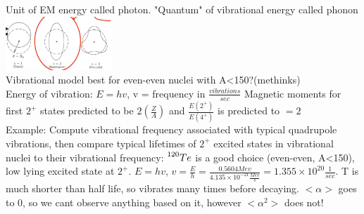 \documentclass{article}
\begin{document}
\begin{multicols}{3}
Unit of EM energy called photon.  "Quantum" of vibrational energy called phonon\\
\includegraphics[width=4cm]{images/vibrations.jpg}\\
Vibrational model best for even-even nuclei with A<150?(methinks)\\
Energy of vibration: $E = hv$, v = frequency in $\frac{vibrations}{sec}$
Magnetic moments for first $2^{+}$ states predicted to be $2(\frac{Z}{A})$ and $\frac{E(2^{+})}{E(4^{+})}$ is predicted to $=2$ \\
Example:  Compute vibrational frequency associated with typical quadrupole vibrations, then compare typical lifetimes of $2^{+}$ excited states in vibrational nuclei to their vibrational frequency:  $\prescript{120}{}{Te}$ is a good choice (even-even, A<150), low lying excited state at $2^{+}$.  $E = hv$, $v = \frac{E}{h} = \frac{0.5604Mev}{4.135\times10^{-21}\frac{Mev}{s}} = 1.355\times10^{20}\frac{1}{sec}$.  T is much shorter than half life, so vibrates many times before decaying. $<\alpha>$ goes to 0, so we cant observe anything based on it, however $<\alpha^{2}>$ does not!


\end{multicols}
\end{document}
